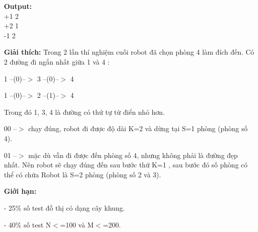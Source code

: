 \textbf{Output:}
\\+1 2
\\+2 1
\\-1 2

\textbf{Giải thích: } Trong 2 lần thí nghiệm cuối robot đã chọn phòng 4 làm đích đến. Có 2 đường đi ngắn nhất giữa 1 và 4 :

1 --(0)--$>$ 3 --(0)--$>$ 4

1 --(0)--$>$ 2 --(1)--$>$ 4

Trong đó 1, 3, 4 là đường có thứ tự từ điển nhỏ hơn.

00 --$>$ chạy đúng, robot đi được độ dài K=2 và dừng tại S=1 phòng (phòng số 4).

01 --$>$ mặc dù vẫn đi được đến phòng số 4, nhưng không phải là đường đẹp nhất. Nên robot sẽ chạy đúng đến sau bước thứ K=1 , sau bước đó số phòng có thể có chứa Robot là S=2 phòng (phòng số 2 và 3).

\textbf{Giới hạn: }

- 25\% số test đồ thị có dạng cây khung.

- 40\% số test N$<$=100 và M$<$=200.